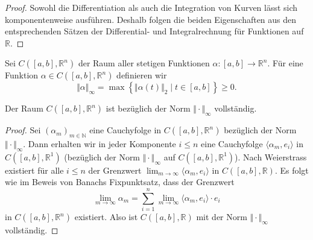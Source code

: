 \documentclass[../main.tex]{subfiles}
\begin{document}
\begin{proof}
  Sowohl die Differentiation als auch die Integration von Kurven
  lässt sich komponentenweise ausführen.
  Deshalb folgen die beiden Eigenschaften aus den entsprechenden
  Sätzen der Differential- und Integralrechnung für Funktionen
  auf $\mathbb{R}$.
\end{proof}

Sei $C([a, b], \mathbb{R}^n)$ der Raum aller stetigen
Funktionen $\alpha \colon [a, b] \to \mathbb{R}^n$.
Für eine Funktion $\alpha \in C([a, b], \mathbb{R}^n)$ definieren wir
\[
  \Vert \alpha \Vert_{\infty}
  = \max \left\{\Vert \alpha(t) \Vert_2 \mid 
  t \in [a, b]\right\} \geq 0.
\]

\begin{lemma}
  Der Raum $C([a, b], \mathbb{R}^n)$ ist bezüglich der Norm
  $\Vert \cdot \Vert_{\infty}$ vollständig.
\end{lemma}

\begin{proof}
  Sei ${(\alpha_{m})}_{m \in \mathbb{N}}$ 
  eine Cauchyfolge in $C([a, b], \mathbb{R}^n)$ bezüglich der Norm 
  $\Vert \cdot \Vert_{\infty}$.
  Dann erhalten wir in jeder Komponente $i \leq n$ 
  eine Cauchyfolge $\langle \alpha_m, e_i \rangle$ 
  in $C([a, b], \mathbb{R}^1)$ (bezüglich der Norm
  $\Vert \cdot \Vert_{\infty}$ auf $C([a, b], \mathbb{R}^1)$).
  Nach Weierstrass existiert für alle $i \leq n$ 
  der Grenzwert
  $\lim_{m \to \infty} \langle \alpha_m, e_i \rangle$ 
  in $C([a, b], \mathbb{R})$.
  Es folgt
  wie im Beweis von Banachs Fixpunktsatz, dass der Grenzwert
  \[
    \lim_{m \to \infty} \alpha_m
    = \sum_{i=1}^{n} \lim_{m \to \infty}
    \langle \alpha_m, e_i \rangle \cdot e_i 
  \]
  in $C([a, b], \mathbb{R}^n)$ existiert.
  Also ist $C([a, b], \mathbb{R})$ mit der Norm $\Vert \cdot \Vert_\infty$ vollständig.
\end{proof}
\end{document}
